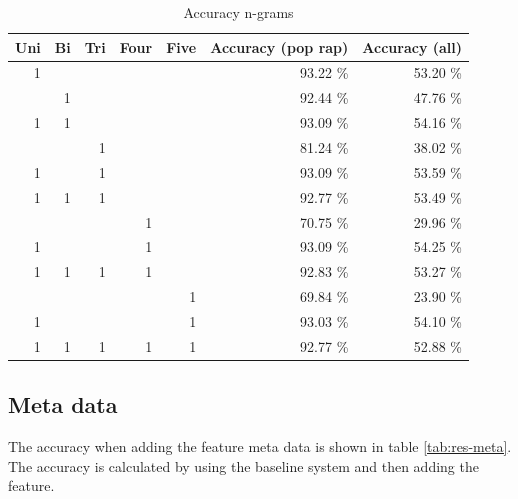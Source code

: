 \documentclass[a4paper, 12pt]{article}
\begin{document}
\begin{table}[H]
\begin{center}
    \begin{tabular}{| r | r | r | r | r | r | r |}
        \hline
        Uni & Bi & Tri & Four & Five & Accuracy (pop rap) & Accuracy (all) \\
        \hline
        1 &   &   &   &   & 93.22 \% & 53.20 \% \\ \hline
          & 1 &   &   &   &  92.44 \% & 47.76 \% \\ \hline
        1 & 1 &   &   &   &  93.09 \% & \cellcolor{Green} 54.16 \% \\ \hline
          &   & 1 &   &   &  81.24 \% & 38.02 \% \\ \hline
        1 &   & 1 &   &   &  93.09 \% & \cellcolor{Green} 53.59 \% \\ \hline
        1 & 1 & 1 &   &   &  92.77 \% & \cellcolor{Green} 53.49 \% \\ \hline
          &   &   & 1 &   &  70.75 \% & 29.96 \% \\ \hline
        1 &   &   & 1 &   &  93.09 \% & \cellcolor{Green}54.25 \% \\ \hline
        1 & 1 & 1 & 1 &   &  92.83 \% & \cellcolor{Green}53.27 \% \\ \hline
          &   &   &   & 1 &  69.84 \% & 23.90 \% \\ \hline
        1 &   &   &   & 1 &  93.03 \% & \cellcolor{Green} 54.10 \% \\ \hline
        1 & 1 & 1 & 1 & 1 &  92.77 \% & 52.88 \% \\ \hline
    \end{tabular}
    \caption{Accuracy n-grams}
    \label{tab:res-ngram}
\end{center}
\end{table}

\subsection{Meta data}
The accuracy when adding the feature meta data is shown in table \ref{tab:res-meta}.
The accuracy is calculated by using the baseline system and then adding the feature.
\end{document}
